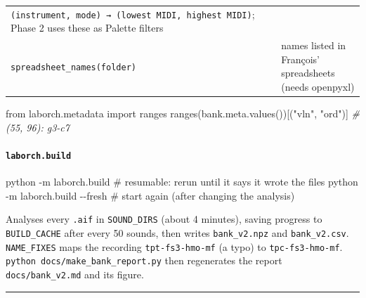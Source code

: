 \documentclass[
  10pt,
]{article}
\newenvironment{Shaded}{\begin{snugshade}}{\end{snugshade}}
\newcommand{\CommentTok}[1]{\textcolor[rgb]{0.56,0.35,0.01}{\textit{#1}}}
\newcommand{\ExtensionTok}[1]{#1}
\newcommand{\ImportTok}[1]{#1}
\newcommand{\NormalTok}[1]{#1}
\newcommand{\StringTok}[1]{\textcolor[rgb]{0.31,0.60,0.02}{#1}}
\begin{document}
\begin{longtable}[]{@{}ll@{}}
\begin{minipage}[t]{0.47\columnwidth}\raggedright
\texttt{(instrument,\ mode)\ →\ (lowest\ MIDI,\ highest\ MIDI)};
Phase 2 uses these as Palette filters\strut
\end{minipage}\tabularnewline
\begin{minipage}[t]{0.47\columnwidth}\raggedright
\texttt{spreadsheet\_names(folder)}\strut
\end{minipage} &
\begin{minipage}[t]{0.47\columnwidth}\raggedright
names listed in François' spreadsheets (needs
openpyxl)\strut
\end{minipage}\tabularnewline
\bottomrule
\end{longtable}

\begin{Shaded}
\begin{Highlighting}[]
\ImportTok{from}\NormalTok{ laborch.metadata }\ImportTok{import}\NormalTok{ ranges}
\NormalTok{ranges(bank.meta.values())[(}\StringTok{"vln"}\NormalTok{, }\StringTok{"ord"}\NormalTok{)]     }\CommentTok{\# (55, 96): g3{-}c7}
\end{Highlighting}
\end{Shaded}

\paragraph{\texorpdfstring{\texttt{laborch.build}}{laborch.build}}

\begin{Shaded}
\begin{Highlighting}[]
\ExtensionTok{python}\NormalTok{ {-}m laborch.build            \# resumable: rerun until it says it wrote the files}
\ExtensionTok{python}\NormalTok{ {-}m laborch.build {-}{-}fresh    \# start again (after changing the analysis)}
\end{Highlighting}
\end{Shaded}

Analyses every \texttt{.aif} in \texttt{SOUND\_DIRS} (about
4 minutes), saving progress to \texttt{BUILD\_CACHE} after
every 50 sounds, then writes \texttt{bank\_v2.npz} and
\texttt{bank\_v2.csv}. \texttt{NAME\_FIXES} maps the
recording \texttt{tpt-fs3-hmo-mf} (a typo) to
\texttt{tpc-fs3-hmo-mf}.
\texttt{python\ docs/make\_bank\_report.py} then regenerates
the report \texttt{docs/bank\_v2.md} and its figure.

\begin{center}\rule{0.5\linewidth}{0.5pt}\end{center}
\end{document}

